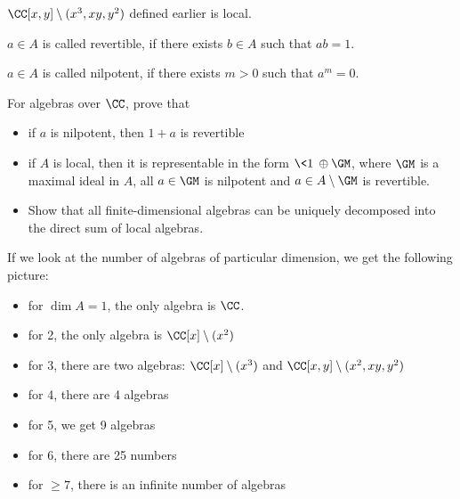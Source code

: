 \documentclass[11pt]{scrartcl}
\begin{document}
  \begin{example}

    $\CC[x, y]\setminus (x^{3}, xy, y^{2})$ defined earlier is local.

  \end{example}

  \begin{definition}
    $a\in A$ is called revertible, if there exists $b \in A$ such that
    $ab = 1$.
  \end{definition}

  \begin{definition}
    $a\in A$ is called nilpotent, if there exists $m > 0$ such that
    $a^{m} = 0$.
  \end{definition}

  \begin{problem*}
    \hfill

    For algebras over $\CC$, prove that
    \begin{itemize}
    \item if $a$ is nilpotent, then $1+a$ is revertible
    \item if $A$ is local, then it is representable in the form
      $\<1\> \oplus \GM$, where $\GM$ is a maximal ideal in $A$, all
      $a\in \GM$ is nilpotent and $a\in A\setminus \GM$ is revertible.
    \item Show that all finite-dimensional algebras can be uniquely
      decomposed into the direct sum of local algebras.
    \end{itemize}
  \end{problem*}

  If we look at the number of algebras of particular dimension, we get
  the following picture:

  \begin{itemize}
  \item for $\dim A = 1$, the only algebra is $\CC$.
  \item for 2, the only algebra is $\CC[x]\setminus (x^{2})$
  \item for 3, there are two algebras: $\CC[x]\setminus (x^{3})$ and
    $\CC[x, y]\setminus (x^{2}, xy, y^{2})$
  \item for 4, there are 4 algebras
  \item for 5, we get 9 algebras
  \item for 6, there are 25 numbers
  \item for $\geq 7$, there is an infinite number of algebras
  \end{itemize}
\end{document}
